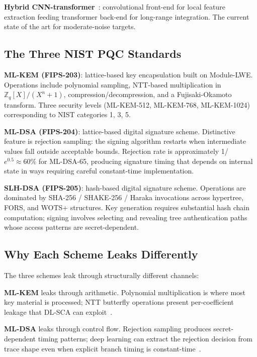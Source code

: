 \documentclass[sigconf,nonacm]{acmart}
\begin{document}
\textbf{Hybrid CNN-transformer}~\cite{wu2024hybridsca}: convolutional
front-end for local feature extraction feeding transformer back-end for
long-range integration. The current state of the art for moderate-noise
targets.

\subsection{The Three NIST PQC Standards}

\textbf{ML-KEM (FIPS-203)}: lattice-based key encapsulation built on
Module-LWE. Operations include polynomial sampling, NTT-based
multiplication in $\mathbb{Z}_q[X]/(X^n+1)$, compression/decompression,
and a Fujisaki-Okamoto transform. Three security levels (ML-KEM-512,
ML-KEM-768, ML-KEM-1024) corresponding to NIST categories 1, 3, 5.

\textbf{ML-DSA (FIPS-204)}: lattice-based digital signature scheme.
Distinctive feature is rejection sampling: the signing algorithm
restarts when intermediate values fall outside acceptable bounds.
Rejection rate is approximately 1/$e^{0.5} \approx 60\%$ for ML-DSA-65,
producing signature timing that depends on internal state in
ways requiring careful constant-time implementation.

\textbf{SLH-DSA (FIPS-205)}: hash-based digital signature scheme.
Operations are dominated by SHA-256 / SHAKE-256 / Haraka invocations
across hypertree, FORS, and WOTS+ structures. Key generation requires
substantial hash chain computation; signing involves selecting and
revealing tree authentication paths whose access patterns are
secret-dependent.

\subsection{Why Each Scheme Leaks Differently}

The three schemes leak through structurally different channels:

\textbf{ML-KEM} leaks through arithmetic. Polynomial multiplication is
where most key material is processed; NTT butterfly operations
present per-coefficient leakage that DL-SCA can exploit~\cite{karayalcin2024kyber}.

\textbf{ML-DSA} leaks through control flow. Rejection sampling produces
secret-dependent timing patterns; deep learning can extract the rejection
decision from trace shape even when explicit branch timing is
constant-time~\cite{berzati2023dilithium,marzougui2025dilithium}.
\end{document}
